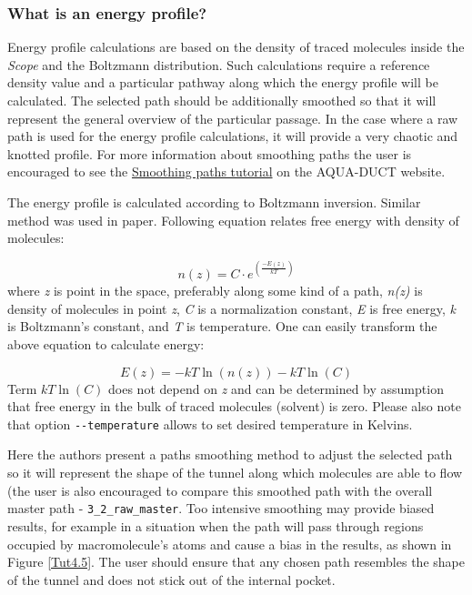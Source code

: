 \documentclass[9pt,tutorial, pubversion]{livecoms}
\begin{document}
\subsubsection{What is an energy profile?}
Energy profile calculations are based on the density of traced molecules inside the \emph{Scope} and the Boltzmann distribution. Such calculations require a reference density value and a particular pathway along which the energy profile will be calculated. The selected path should be additionally smoothed so that it will represent the general overview of the particular passage. In the case where a raw path is used for the energy profile calculations, it will provide a very chaotic and knotted profile. For more information about smoothing paths the user is encouraged to see the \href{http://www.aquaduct.pl/smoothing-paths/}{Smoothing paths tutorial} on the AQUA-DUCT website.

The energy profile is calculated according to Boltzmann inversion. Similar method was used in \cite{Rao2017} paper. Following equation relates free energy with density of molecules:

\[ \textstyle n\left(z\right) = C \cdot \textstyle e^{ \textstyle \left(\frac{-E\left(z\right)}{kT}\right)} \]
where \textit{z} is point in the space, preferably along some kind of a path, \textit{n(z)} is density of molecules in point \textit{z}, \textit{C} is a normalization constant, \textit{E} is free energy, \textit{k} is Boltzmann’s constant, and \textit{T} is temperature.
One can easily transform the above equation to calculate energy:

\[ \displaystyle E\left(z\right) = -kT\ln\left( n\left( z\right)\right) - kT\ln\left(C\right) \]
Term \( \displaystyle kT\ln\left(C\right)\) does not depend on \textit{z} and can be determined by assumption that free energy in the bulk of traced molecules (solvent) is zero. Please also note that option \texttt{-{}-temperature} allows to set desired temperature in Kelvins.

Here the authors present a paths smoothing method to adjust the selected path so it will represent the shape of the tunnel along which molecules are able to flow (the user is also encouraged to compare this smoothed path with the overall master path -  \texttt{3\_2\_raw\_master}. Too intensive smoothing may provide biased results, for example in a situation when the path will pass through regions occupied by macromolecule's atoms and cause a bias in the results, as shown in Figure \ref{Tut4.5}. The user should ensure that any chosen path resembles the shape of the tunnel and does not stick out of the internal pocket.
\end{document}
